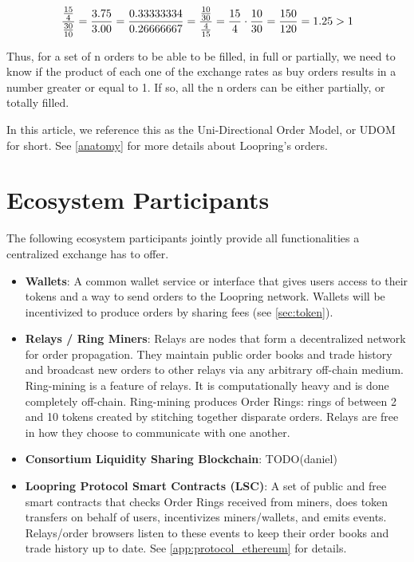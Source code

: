 \documentclass[UTF8,nofonts]{article}
\begin{document}
\begin{multicols}{2}
\begin{equation}
{{15\over 4} \over {30\over 10}} = {3.75 \over 3.00}	= {0.33333334 \over 0.26666667} = {{10 \over 30} \over {4 \over 15}} = {15 \over 4} \cdot {10 \over 30} = {150 \over 120} = 1.25 > 1
\end{equation}

Thus, for a set of n orders to be able to be filled, in full or partially, we need to know if the product of each one of the exchange rates as buy orders results in a number greater or equal to 1. If so, all the n orders can be either partially, or totally filled.


In this article, we reference this as the Uni-Directional Order Model, or UDOM for short. See \ref{anatomy} for more details about Loopring's orders.


\section{Ecosystem Participants\label{sec:ecosystem}}
The following ecosystem participants jointly provide all functionalities a centralized exchange has to offer. 

\begin{itemize}

\item \textbf{Wallets}: A common wallet service or interface that gives users access to their tokens and a way to send orders to the Loopring network. Wallets will be incentivized to produce orders by sharing fees (see \ref{sec:token}).

\item \textbf{Relays / Ring Miners}: Relays are nodes that form a decentralized network for order propagation. They maintain public order books and trade history and broadcast new orders to other relays via any arbitrary off-chain medium. Ring-mining is a feature of relays. It is computationally heavy and is done completely off-chain. Ring-mining produces Order Rings: rings of between 2 and 10 tokens created by stitching together disparate orders. Relays are free in how they choose to communicate with one another. 

\item \textbf{Consortium Liquidity Sharing Blockchain}: TODO(daniel)

\item \textbf{Loopring Protocol Smart Contracts (LSC)}: A set of public and free smart contracts that checks Order Rings received from miners, does token transfers on behalf of users, incentivizes miners/wallets, and emits events. Relays/order browsers listen to these events to keep their order books and trade history up to date. See \ref{app:protocol_ethereum} for details.


\end{itemize}
\end{multicols}
\end{document}
